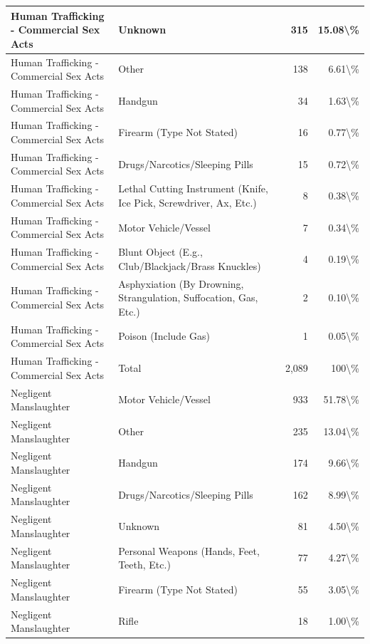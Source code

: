 \documentclass[
]{krantz}
\begin{document}
\begin{longtable}[t]{l|l|r|r}
\hline
Human Trafficking - Commercial Sex Acts & Unknown & 315 & 15.08\textbackslash{}\%\\
\hline
Human Trafficking - Commercial Sex Acts & Other & 138 & 6.61\textbackslash{}\%\\
\hline
Human Trafficking - Commercial Sex Acts & Handgun & 34 & 1.63\textbackslash{}\%\\
\hline
Human Trafficking - Commercial Sex Acts & Firearm (Type Not Stated) & 16 & 0.77\textbackslash{}\%\\
\hline
Human Trafficking - Commercial Sex Acts & Drugs/Narcotics/Sleeping Pills & 15 & 0.72\textbackslash{}\%\\
\hline
Human Trafficking - Commercial Sex Acts & Lethal Cutting Instrument (Knife, Ice Pick, Screwdriver, Ax, Etc.) & 8 & 0.38\textbackslash{}\%\\
\hline
Human Trafficking - Commercial Sex Acts & Motor Vehicle/Vessel & 7 & 0.34\textbackslash{}\%\\
\hline
Human Trafficking - Commercial Sex Acts & Blunt Object (E.g., Club/Blackjack/Brass Knuckles) & 4 & 0.19\textbackslash{}\%\\
\hline
Human Trafficking - Commercial Sex Acts & Asphyxiation (By Drowning, Strangulation, Suffocation, Gas, Etc.) & 2 & 0.10\textbackslash{}\%\\
\hline
Human Trafficking - Commercial Sex Acts & Poison (Include Gas) & 1 & 0.05\textbackslash{}\%\\
\hline
Human Trafficking - Commercial Sex Acts & Total & 2,089 & 100\textbackslash{}\%\\
\hline
Negligent Manslaughter & Motor Vehicle/Vessel & 933 & 51.78\textbackslash{}\%\\
\hline
Negligent Manslaughter & Other & 235 & 13.04\textbackslash{}\%\\
\hline
Negligent Manslaughter & Handgun & 174 & 9.66\textbackslash{}\%\\
\hline
Negligent Manslaughter & Drugs/Narcotics/Sleeping Pills & 162 & 8.99\textbackslash{}\%\\
\hline
Negligent Manslaughter & Unknown & 81 & 4.50\textbackslash{}\%\\
\hline
Negligent Manslaughter & Personal Weapons (Hands, Feet, Teeth, Etc.) & 77 & 4.27\textbackslash{}\%\\
\hline
Negligent Manslaughter & Firearm (Type Not Stated) & 55 & 3.05\textbackslash{}\%\\
\hline
Negligent Manslaughter & Rifle & 18 & 1.00\textbackslash{}\%\\

\end{longtable}
\end{document}
